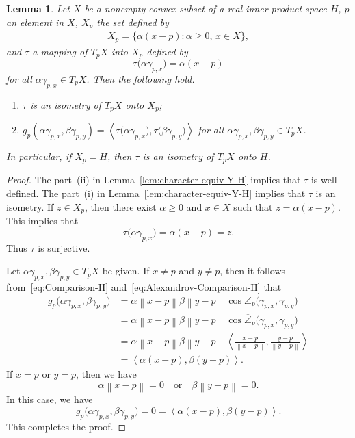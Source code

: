 \documentclass[draft]{amsart}
\numberwithin{equation}{section}
\providecommand{\norm}[1]{\left\lVert#1\right\rVert}
\newcommand{\ip}[2]{\left\langle #1, #2 \right\rangle}
\theoremstyle{plain}
\newtheorem{lemma}[theorem]{Lemma}
\theoremstyle{definition}
\theoremstyle{remark}
\begin{document}
\begin{lemma}\label{lem:Tangent-space-H}
 Let $X$ be a nonempty convex subset of 
 a real inner product space $H$, $p$ an element in $X$, 
 $X_p$ the set defined by 
 \begin{align}\label{eq:def-X_p}
  X_p=\bigl\{\alpha (x-p): \alpha \geq 0, \, x\in X\bigr\}, 
 \end{align}
 and $\tau$ a mapping of $T_pX$ into $X_p$ defined by 
 \[
  \tau\bigl(\alpha \gamma_{p,x}\bigr) 
  = \alpha (x-p)
 \]
 for all $\alpha \gamma_{p,x}\in T_pX$. 
 Then the following hold. 
 \begin{enumerate}
  \item[(i)] $\tau$ is an isometry of $T_pX$ onto $X_p$; 
  \item[(ii)] $g_p(\alpha \gamma_{p,x}, \beta\gamma_{p,y}) 
 =\ip{\tau\bigl(\alpha \gamma_{p,x}\bigr)}
 {\tau\bigl(\beta \gamma_{p,y}\bigr) }$ 
  for all $\alpha \gamma_{p,x}, \beta \gamma_{p,y} \in T_pX$. 
 \end{enumerate}
 In particular, if $X_p=H$, then 
 $\tau$ is an isometry of $T_pX$ onto $H$. 
\end{lemma}

\begin{proof}
 The part~(ii) in Lemma~\ref{lem:character-equiv-Y-H} 
 implies that $\tau$ is well defined. 
 The part~(i) in Lemma~\ref{lem:character-equiv-Y-H} 
 implies that $\tau$ is an isometry. 
 If $z\in X_p$, then there exist 
 $\alpha \geq 0$ and $x\in X$ such that 
 $z=\alpha (x-p)$. This implies that 
 \[
  \tau \bigl(\alpha \gamma_{p, x}\bigr)
  = \alpha (x -p) = z. 
 \]
 Thus $\tau$ is surjective. 

 Let $\alpha \gamma_{p,x}, \beta \gamma_{p,y} \in T_pX$ be given. 
 If $x\neq p$ and $y\neq p$, 
 then it follows from~\eqref{eq:Comparison-H} 
 and~\eqref{eq:Alexandrov-Comparison-H} that 
 \begin{align*}
 g_p\bigl(\alpha \gamma_{p,x}, \beta \gamma_{p,y}\bigr) 
  &=\alpha \norm{x-p}\beta \norm{y-p} 
 \cos \angle_{p}\bigl(\gamma_{p,x}, \gamma_{p,y}\bigr) \\
  &=\alpha \norm{x-p}\beta \norm{y-p} 
 \cos \overline{\angle}_{p}\bigl(\gamma_{p,x}, \gamma_{p,y}\bigr) \\
  &=\alpha \norm{x-p}\beta \norm{y-p} 
  \ip{
 \frac{x-p}{\norm{x-p}}
 }{
  \frac{y-p}{\norm{y-p}}
 } \\
  &=\ip{\alpha (x-p)}{\beta(y-p)}. 
 \end{align*}
 If $x=p$ or $y=p$, 
 then we have 
 \[
  \alpha \norm{x-p} = 0 \quad \textrm{or} \quad 
  \beta \norm{y-p}=0. 
 \]
 In this case, we have 
 \[
  g_p\bigl(\alpha \gamma_{p,x}, \beta \gamma_{p,y}\bigr) 
  = 0 
  = \ip{\alpha (x-p)}{\beta (y-p)}. 
 \]
 This completes the proof. 
\end{proof}
\end{document}
